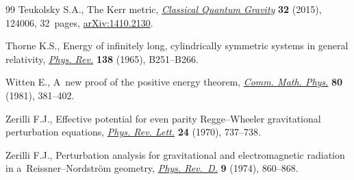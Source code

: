 \documentclass[pdftex]{sigma}
\numberwithin{equation}{section}
\begin{document}
\begin{thebibliography}{99}
Teukolsky S.A., The {K}err metric,
 \href{https://doi.org/10.1088/0264-9381/32/12/124006}{\textit{Classical
 Quantum Gravity}} \textbf{32} (2015), 124006, 32~pages,
 \href{http://arxiv.org/abs/1410.2130}{arXiv:1410.2130}.

Thorne K.S., Energy of infinitely long, cylindrically symmetric systems in
 general relativity,
 \href{https://doi.org/10.1103/PhysRev.138.B251}{\textit{Phys. Rev.}}
 \textbf{138} (1965), B251--B266.

Witten E., A~new proof of the positive energy theorem,
 \href{https://doi.org/10.1007/BF01208277}{\textit{Comm. Math. Phys.}}
 \textbf{80} (1981), 381--402.

Zerilli F.J., Effective potential for even parity {R}egge--{W}heeler
 gravitational perturbation equations,
 \href{https://doi.org/10.1103/PhysRevLett.24.737}{\textit{Phys. Rev. Lett.}}
 \textbf{24} (1970), 737--738.

Zerilli F.J., Perturbation analysis for gravitational and electromagnetic
 radiation in a~{R}eissner--{N}ordstr\"om geometry,
 \href{https://doi.org/10.1103/PhysRevD.9.860}{\textit{Phys. Rev.~D.}}
 \textbf{9} (1974), 860--868.

\end{thebibliography}\LastPageEnding
\end{document}
